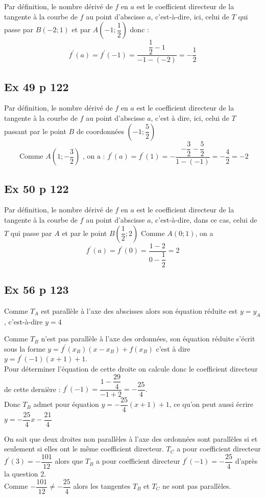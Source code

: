 \documentclass[12pt,a4paper]{book}
\begin{document}
Par définition, le nombre dérivé de $f$ en $a$ est le coefficient directeur de la tangente à la courbe de $f$
au point d'abscisse $a$, c'est-à-dire, ici, celui de $T$ qui passe par $B(-2 ; 1)$ et par $A\left(-1 ; \dfrac{1}{2}\right)$
donc :
$$
f^{\prime}(a)=f^{\prime}(-1)=\dfrac{\dfrac{1}{2}-1}{-1-(-2)}=-\dfrac{1}{2}
$$

\subsection*{Ex 49 p 122}

Par définition, le nombre dérivé de $f$ en $a$ est le coefficient directeur de la tangente à la courbe de $f$
au point d'abscisse $a$, c'est à dire, ici, celui de $T$ passant par le point $B$ de coordonnées $\left(-1 ; \dfrac{5}{2}\right)$
$$
\text { Comme } A\left(1 ;-\dfrac{3}{2}\right) \text { , on a : } f^{\prime}(a)=f^{\prime}(1)=-\dfrac{-\dfrac{3}{2}-\dfrac{5}{2}}{1-(-1)}=-\dfrac{4}{2}=-2
$$

\subsection*{Ex 50 p 122}

Par définition, le nombre dérivé de $f$ en $a$ est le coefficient directeur de la tangente à la courbe de $f$
au point d'abscisse $a$, c'est-à-dire, dans ce cas, celui de $T$ qui passe par $A$ et par le point $B\left(\dfrac{1}{2} ; 2\right)$
Comme $A(0 ; 1)$, on a
$$
f^{\prime}(a)=f^{\prime}(0)=\dfrac{1-2}{0-\dfrac{1}{2}}=2
$$


\subsection*{Ex 56 p 123}

\begin{enumMet}
    \item Comme $T_{A}$ est parallèle à l'axe des abscisses alors son équation réduite est $y=y_{A}$, c'est-à-dire $y=4$
    \item Comme $T_{B}$ n'est pas parallèle à l'axe des ordonnées, son équation réduite s'écrit sous la forme $y=f^{\prime}\left(x_{B}\right)\left(x-x_{B}\right)+f\left(x_{B}\right)$ c'est à dire $y=f^{\prime}(-1)(x+1)+1$.\\
    Pour déterminer l'équation de cette droite on calcule donc le coefficient directeur de cette dernière :
    $f^{\prime}(-1)=\dfrac{1-\dfrac{29}{4}}{-1+2}=-\dfrac{25}{4}$.\\
Donc $T_{B}$ admet pour équation $y=-\dfrac{25}{4}(x+1)+1$, ce qu'on
peut aussi écrire $y=-\dfrac{25}{4} x-\dfrac{21}{4}$
    \item On sait que deux droites non parallèles à l'axe des ordonnées sont parallèles si et seulement si elles ont le même coefficient directeur. $T_{C}$ a pour coefficient directeur $f^{\prime}(3)=-\dfrac{101}{12}$ alors 
que $T_{B}$ a pour coefficient directeur $f^{\prime}(-1)=-\dfrac{25}{4}$ d'après la question 2.\\
Comme $-\dfrac{101}{12} \neq-\dfrac{25}{4}$ alors les tangentes $T_{B}$ et $T_{C}$ ne sont pas parallèles.
\end{enumMet}
\end{document}
